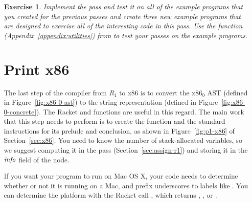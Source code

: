 \documentclass[11pt]{book}
\newtheorem{exercise}[theorem]{Exercise}
\begin{document}
\begin{exercise}
\normalfont
Implement the  pass and test it on all of the
example programs that you created for the previous passes and create
three new example programs that are designed to exercise all of the
interesting code in this pass. Use the  function
(Appendix~\ref{appendix:utilities}) from  to test
your passes on the example programs.
\end{exercise}


\section{Print x86}
\label{sec:print-x86}

The last step of the compiler from $R_1$ to x86 is to convert the
$\text{x86}_0$ AST (defined in Figure~\ref{fig:x86-0-ast}) to the
string representation (defined in Figure~\ref{fig:x86-0-concrete}). The Racket
 and  functions are useful in this
regard. The main work that this step needs to perform is to create the
 function and the standard instructions for its prelude and
conclusion, as shown in Figure~\ref{fig:p1-x86} of
Section~\ref{sec:x86}. You need to know the number of stack-allocated
variables, so we suggest computing it in the  pass
(Section~\ref{sec:assign-r1}) and storing it in the $\mathit{info}$ field
of the  node.




If you want your program to run on Mac OS X, your code needs to
determine whether or not it is running on a Mac, and prefix
underscores to labels like .  You can determine the platform
with the Racket call , which returns
, , or .  
\end{document}
